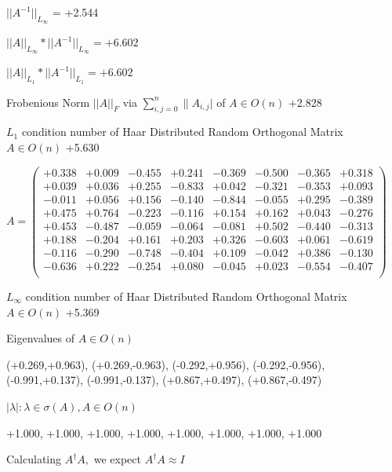 \documentclass[9pt]{article}
\theoremstyle{plain}
\theoremstyle{definition}
\theoremstyle{remark}
\numberwithin{equation}{section}
\begin{document}
$||A^{-1}||_{L_{\infty}}$ = +2.544

$||A||_{L_{\infty}} * ||A^{-1}||_{L_{\infty}} = +6.602$

$||A||_{L_1} * ||A^{-1}||_{L_1} = +6.602$

Frobenious Norm  $||A||_{\textit{F}}$ via $\sum\limits_{i,j =0}^{n} \|A_{i,j}|$   of  $A \in O(n)$  +2.828

$L_1$ condition number of Haar Distributed Random Orthogonal Matrix $A \in O(n)$ +5.630

$A = \left(
\begin{array}{
cccccccc}
+0.338 & +0.009 & -0.455 & +0.241 & -0.369 & -0.500 & -0.365 & +0.318 \\
+0.039 & +0.036 & +0.255 & -0.833 & +0.042 & -0.321 & -0.353 & +0.093 \\
-0.011 & +0.056 & +0.156 & -0.140 & -0.844 & -0.055 & +0.295 & -0.389 \\
+0.475 & +0.764 & -0.223 & -0.116 & +0.154 & +0.162 & +0.043 & -0.276 \\
+0.453 & -0.487 & -0.059 & -0.064 & -0.081 & +0.502 & -0.440 & -0.313 \\
+0.188 & -0.204 & +0.161 & +0.203 & +0.326 & -0.603 & +0.061 & -0.619 \\
-0.116 & -0.290 & -0.748 & -0.404 & +0.109 & -0.042 & +0.386 & -0.130 \\
-0.636 & +0.222 & -0.254 & +0.080 & -0.045 & +0.023 & -0.554 & -0.407 \\
\end{array}
\right)$ \newline 

$L_{\infty}$ condition number of Haar Distributed Random Orthogonal Matrix $A \in O(n)$ +5.369

Eigenvalues of $A \in O(n)$

(+0.269,+0.963), (+0.269,-0.963), (-0.292,+0.956), (-0.292,-0.956), (-0.991,+0.137), (-0.991,-0.137), (+0.867,+0.497), (+0.867,-0.497)

 $|\lambda | : \lambda \in \sigma(A) , A \in O(n)$

+1.000, +1.000, +1.000, +1.000, +1.000, +1.000, +1.000, +1.000


Calculating $A^{\dag} A,$  we expect $A^{\dag} A \approx I$
\end{document}
